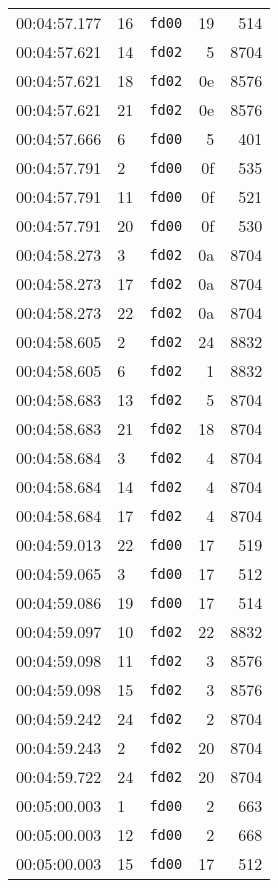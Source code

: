 \documentclass{article}
\begin{document}
\begin{longtable}{lllrr}
00:04:57.177 & 16 & \texttt{fd00} & 19 & 514 \\
00:04:57.621 & 14 & \texttt{fd02} & 5 & 8704 \\
00:04:57.621 & 18 & \texttt{fd02} & 0e & 8576 \\
00:04:57.621 & 21 & \texttt{fd02} & 0e & 8576 \\
00:04:57.666 & 6 & \texttt{fd00} & 5 & 401 \\
00:04:57.791 & 2 & \texttt{fd00} & 0f & 535 \\
00:04:57.791 & 11 & \texttt{fd00} & 0f & 521 \\
00:04:57.791 & 20 & \texttt{fd00} & 0f & 530 \\
00:04:58.273 & 3 & \texttt{fd02} & 0a & 8704 \\
00:04:58.273 & 17 & \texttt{fd02} & 0a & 8704 \\
00:04:58.273 & 22 & \texttt{fd02} & 0a & 8704 \\
00:04:58.605 & 2 & \texttt{fd02} & 24 & 8832 \\
00:04:58.605 & 6 & \texttt{fd02} & 1 & 8832 \\
00:04:58.683 & 13 & \texttt{fd02} & 5 & 8704 \\
00:04:58.683 & 21 & \texttt{fd02} & 18 & 8704 \\
00:04:58.684 & 3 & \texttt{fd02} & 4 & 8704 \\
00:04:58.684 & 14 & \texttt{fd02} & 4 & 8704 \\
00:04:58.684 & 17 & \texttt{fd02} & 4 & 8704 \\
00:04:59.013 & 22 & \texttt{fd00} & 17 & 519 \\
00:04:59.065 & 3 & \texttt{fd00} & 17 & 512 \\
00:04:59.086 & 19 & \texttt{fd00} & 17 & 514 \\
00:04:59.097 & 10 & \texttt{fd02} & 22 & 8832 \\
00:04:59.098 & 11 & \texttt{fd02} & 3 & 8576 \\
00:04:59.098 & 15 & \texttt{fd02} & 3 & 8576 \\
00:04:59.242 & 24 & \texttt{fd02} & 2 & 8704 \\
00:04:59.243 & 2 & \texttt{fd02} & 20 & 8704 \\
00:04:59.722 & 24 & \texttt{fd02} & 20 & 8704 \\
00:05:00.003 & 1 & \texttt{fd00} & 2 & 663 \\
00:05:00.003 & 12 & \texttt{fd00} & 2 & 668 \\
00:05:00.003 & 15 & \texttt{fd00} & 17 & 512 \\

\end{longtable}
\end{document}
